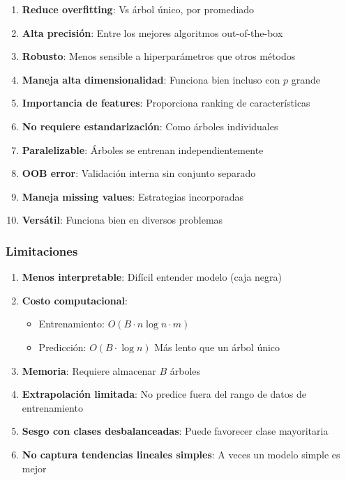 \documentclass[
  doc,
  floatsintext,
  longtable,
  a4paper,
  nolmodern,
  notxfonts,
  notimes,
  12pt,
  colorlinks=true,linkcolor=blue,citecolor=blue,urlcolor=blue]{apa7}
\providecommand{\tightlist}{%
  \setlength{\itemsep}{0pt}\setlength{\parskip}{0pt}}
\begin{document}
\begin{enumerate}
\def\labelenumi{\arabic{enumi}.}
\item
  \textbf{Reduce overfitting}: Vs árbol único, por promediado
\item
  \textbf{Alta precisión}: Entre los mejores algoritmos out-of-the-box
\item
  \textbf{Robusto}: Menos sensible a hiperparámetros que otros métodos
\item
  \textbf{Maneja alta dimensionalidad}: Funciona bien incluso con \(p\)
  grande
\item
  \textbf{Importancia de features}: Proporciona ranking de
  características
\item
  \textbf{No requiere estandarización}: Como árboles individuales
\item
  \textbf{Paralelizable}: Árboles se entrenan independientemente
\item
  \textbf{OOB error}: Validación interna sin conjunto separado
\item
  \textbf{Maneja missing values}: Estrategias incorporadas
\item
  \textbf{Versátil}: Funciona bien en diversos problemas
\end{enumerate}

\subsubsection{Limitaciones}\label{limitaciones-3}

\begin{enumerate}
\def\labelenumi{\arabic{enumi}.}
\item
  \textbf{Menos interpretable}: Difícil entender modelo (caja negra)
\item
  \textbf{Costo computacional}:

  \begin{itemize}
  \tightlist
  \item
    Entrenamiento: \(O(B \cdot n \log n \cdot m)\)
  \item
    Predicción: \(O(B \cdot \log n)\) Más lento que un árbol único
  \end{itemize}
\item
  \textbf{Memoria}: Requiere almacenar \(B\) árboles
\item
  \textbf{Extrapolación limitada}: No predice fuera del rango de datos
  de entrenamiento
\item
  \textbf{Sesgo con clases desbalanceadas}: Puede favorecer clase
  mayoritaria
\item
  \textbf{No captura tendencias lineales simples}: A veces un modelo
  simple es mejor
\end{enumerate}
\end{document}
